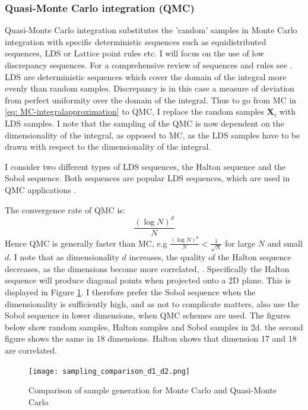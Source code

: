 \documentclass[11pt]{article}
\begin{document}
\subsubsection{Quasi-Monte Carlo integration (QMC)} \label{Subsubsection: QMC}
Quasi-Monte Carlo integration substitutes the 'random' samples in Monte Carlo integration 
with specific deterministic sequences such as equidistributed sequences, \ac{LDS} or Lattice point rules etc.
I will focus on the use of low discrepancy sequences. For a comprehensive review of sequences and rules see \autocite{Judd1998Book}.\\
\ac{LDS} are deterministic sequences which cover the domain of the integral more evenly than random samples. 
Discrepancy is in this case a measure of deviation from perfect uniformity over the domain of the integral.
Thus to go from MC in \eqref{eq: MC-integralapproximation} to QMC, I replace the random samples $\mathbf{X}_i$ with \ac{LDS} samples.
I note that the sampling of the QMC is now dependent on the dimensionality of the integral, as opposed to MC,
as the LDS samples have to be drawn with respect to the dimensionality of the integral.

I consider two different types of \ac{LDS} sequences, the Halton sequence and the Sobol sequence.
Both sequences are popular \ac{LDS} sequences,
which are used in \ac{QMC} applications \autocite{Glasserman2004MC}.

The convergence rate of \ac{QMC} is:
\begin{equation} \label{eq: QMC-convergence}
  \frac{\left( \log N \right)^{d}}{N}
\end{equation}
Hence QMC is generally faster than MC, e.g $\frac{\left( \log N \right)^{d}}{N} < \frac{1}{\sqrt{N}}$ for large $N$ and small $d$.
I note that as dimensionality $d$ increases, the quality of the Halton sequence decreases, as the dimensions become more correlated, \autocite{Glasserman2004MC}.
Specifically the Halton sequence will produce diagonal points when projected onto a 2D plane.
This is displayed in Figure \ref{fig: Sampling_comparison_MC_D1D2}. 
I therefore prefer the Sobol sequence when the dimensionality is sufficiently high,
and as not to complicate matters, also use the Sobol sequence in lower dimensions, when \ac{QMC} schemes are used.
The figures below show random samples, Halton samples and Sobol samples in 2d.
the second figure shows the same in 18 dimensions. Halton shows that dimension 17 and 18 are correlated.
\begin{figure}[h!]
  \begin{center}
  \caption{Comparison of sample generation for Monte Carlo and Quasi-Monte Carlo} 
  \label{fig: Sampling_comparison_MC_D1D2}
  \texttt{[image: sampling\_comparison\_d1\_d2.png]}
  \end{center}
\end{figure}
\end{document}
